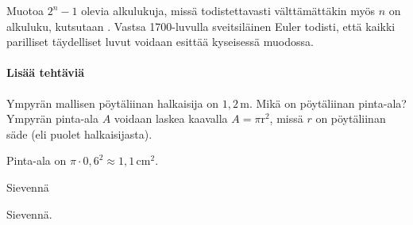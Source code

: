 \begin{tehtavasivu}
\begin{tehtava}
Muotoa $2^n-1$ olevia alkulukuja, missä todistettavasti välttämättäkin myös $n$ on alkuluku, kutsutaan . Vastsa 1700-luvulla sveitsiläinen Euler todisti, että kaikki parilliset täydelliset luvut voidaan esittää kyseisessä muodossa.
	\begin{vastaus}
	\end{vastaus}
\end{tehtava}


\paragraph*{Lisää tehtäviä}

    \begin{tehtava} %
        Ympyrän mallisen pöytäliinan halkaisija on $1,2$\,m.  Mikä on pöytäliinan pinta-ala? Ympyrän pinta-ala $A$ voidaan laskea kaavalla $A=\pi\text{r}^2$, missä $r$ on pöytäliinan säde (eli puolet halkaisijasta).
        \begin{vastaus}
        Pinta-ala on $\pi \cdot 0,6^2 \approx 1,1\,$cm$^2$.
        \end{vastaus}
\end{tehtava}

 \begin{tehtava}
        Sievennä

        \begin{vastaus}
        \end{vastaus}
    \end{tehtava}
    \begin{tehtava}
        Sievennä.
        \begin{vastaus}
        \end{vastaus}
    \end{tehtava}


\end{tehtavasivu}
